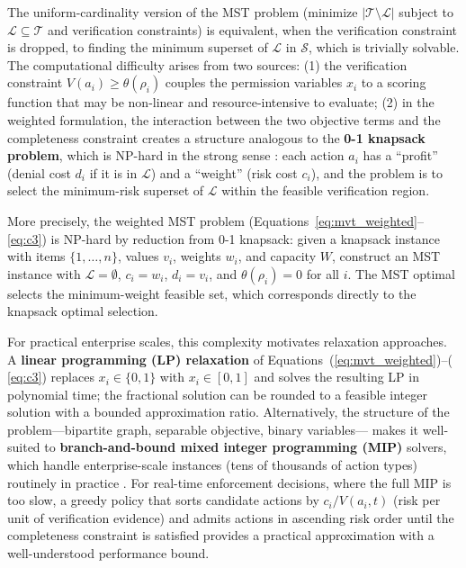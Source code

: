 \documentclass[acmlarge]{acmart}
\begin{document}
The uniform-cardinality version of the MST problem (minimize $|\mathcal{T} \setminus
\mathcal{L}|$ subject to $\mathcal{L} \subseteq \mathcal{T}$ and verification
constraints) is equivalent, when the verification constraint is dropped, to
finding the minimum superset of $\mathcal{L}$ in $\mathcal{S}$, which is trivially
solvable. The computational difficulty arises from two sources: (1) the
verification constraint $V(a_i) \geq \theta(\rho_i)$ couples the permission
variables $x_i$ to a scoring function that may be non-linear and resource-intensive
to evaluate; (2) in the weighted formulation, the interaction between the two
objective terms and the completeness constraint creates a structure analogous to the
\textbf{0-1 knapsack problem}, which is NP-hard in the strong sense
\cite{garey1979}: each action $a_i$ has a ``profit'' (denial cost $d_i$ if it is
in $\mathcal{L}$) and a ``weight'' (risk cost $c_i$), and the problem is to select
the minimum-risk superset of $\mathcal{L}$ within the feasible verification region.

More precisely, the weighted MST problem (Equations~\ref{eq:mvt_weighted}--\ref{eq:c3})
is NP-hard by reduction from 0-1 knapsack: given a knapsack instance with items
$\{1,\ldots,n\}$, values $v_i$, weights $w_i$, and capacity $W$, construct an MST
instance with $\mathcal{L} = \emptyset$, $c_i = w_i$, $d_i = v_i$, and
$\theta(\rho_i) = 0$ for all $i$. The MST optimal selects the minimum-weight
feasible set, which corresponds directly to the knapsack optimal selection.

For practical enterprise scales, this complexity motivates relaxation approaches.
A \textbf{linear programming (LP) relaxation} of Equations~(\ref{eq:mvt_weighted})--(%
\ref{eq:c3}) replaces $x_i \in \{0,1\}$ with $x_i \in [0,1]$ and solves the
resulting LP in polynomial time; the fractional solution can be rounded to a
feasible integer solution with a bounded approximation ratio. Alternatively, the
structure of the problem---bipartite graph, separable objective, binary variables---
makes it well-suited to \textbf{branch-and-bound mixed integer programming (MIP)}
solvers, which handle enterprise-scale instances (tens of thousands of action
types) routinely in practice \cite{wolsey1998}. For real-time enforcement decisions,
where the full MIP is too slow, a greedy policy that sorts candidate actions by
$c_i / V(a_i, t)$ (risk per unit of verification evidence) and admits actions in
ascending risk order until the completeness constraint is satisfied provides a
practical approximation with a well-understood performance bound.
\end{document}
